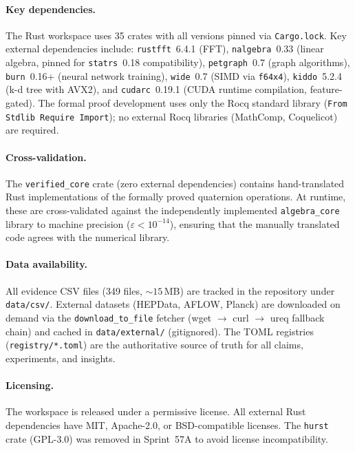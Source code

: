 \documentclass[12pt,openany]{report}
\theoremstyle{definition}
\theoremstyle{plain}
\theoremstyle{remark}
\newcommand{\cratecount}{35}
\begin{document}
\paragraph{Key dependencies.}
The Rust workspace uses \cratecount{} crates with all versions pinned
via \texttt{Cargo.lock}.  Key external dependencies include:
\texttt{rustfft}~6.4.1 (FFT), \texttt{nalgebra}~0.33 (linear algebra,
pinned for \texttt{statrs}~0.18 compatibility), \texttt{petgraph}~0.7
(graph algorithms), \texttt{burn}~0.16+ (neural network training),
\texttt{wide}~0.7 (SIMD via \texttt{f64x4}), \texttt{kiddo}~5.2.4
(k-d tree with AVX2), and \texttt{cudarc}~0.19.1 (CUDA runtime
compilation, feature-gated).  The formal proof development uses only
the Rocq standard library (\texttt{From Stdlib Require Import}); no
external Rocq libraries (MathComp, Coquelicot) are required.

\paragraph{Cross-validation.}
The \texttt{verified\_core} crate (zero external dependencies) contains
hand-translated Rust implementations of the formally proved quaternion
operations.  At runtime, these are cross-validated against the
independently implemented \texttt{algebra\_core} library to machine
precision ($\varepsilon < 10^{-14}$), ensuring that the manually
translated code agrees with the numerical library.

\paragraph{Data availability.}
All evidence CSV files (349 files, ${\sim}15$\,MB) are tracked in the
repository under \texttt{data/csv/}.  External datasets (HEPData,
AFLOW, Planck) are downloaded on demand via the \texttt{download\_to\_file}
fetcher (wget $\to$ curl $\to$ ureq fallback chain) and cached in
\texttt{data/external/} (gitignored).  The TOML registries
(\texttt{registry/*.toml}) are the authoritative source of truth for
all claims, experiments, and insights.

\paragraph{Licensing.}
The workspace is released under a permissive license.  All external
Rust dependencies have MIT, Apache-2.0, or BSD-compatible licenses.
The \texttt{hurst} crate (GPL-3.0) was removed in Sprint~57A to
avoid license incompatibility.
\end{document}
